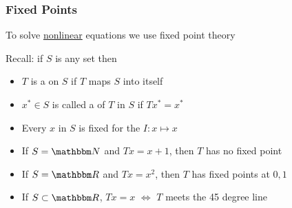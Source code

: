 \begin{frame}
    \frametitle{Fixed Points}    

    To solve \underline{nonlinear} equations we use fixed point theory

            \vspace{0.4em}
            \vspace{0.4em}
    Recall: if $S$ is any set then
    \begin{itemize}
        \item $T$ is a  on $S$ if $T$ maps $S$ into itself
            \vspace{0.4em}
        \item  $x^* \in S$ is called a
             of $T$ in $S$ if $T x^* = x^*$  
    \end{itemize}

            \vspace{0.4em}
            \vspace{0.4em}
    \Egs 
    \begin{itemize}
        \item Every $x$ in $S$ is fixed for the 
            $I \colon x \mapsto x$
            \vspace{0.4em}
        \item If $S = \NN$ and $Tx = x+1$, then $T$ has no fixed point
    \end{itemize}


\end{frame}


\begin{frame}
    
    \Egs
    \begin{itemize}
        \item If $S = \RR$ and $Tx = x^2$, then $T$ has fixed points at $0, 1$
        \vspace{1em}
        \item If $S \subset \RR$,  $Tx =x$ $\iff$ $T$ meets the 45 degree line
    \end{itemize}


\end{frame}



